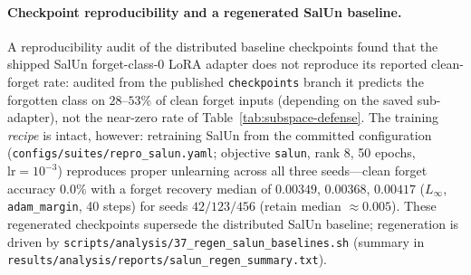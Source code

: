 \documentclass{article}
\begin{document}
\paragraph{Checkpoint reproducibility and a regenerated SalUn baseline.} A reproducibility audit of the distributed baseline checkpoints found that the shipped SalUn forget-class-0 LoRA adapter does not reproduce its reported clean-forget rate: audited from the published \texttt{checkpoints} branch it predicts the forgotten class on $28$--$53\%$ of clean forget inputs (depending on the saved sub-adapter), not the near-zero rate of Table~\ref{tab:subspace-defense}. The training \emph{recipe} is intact, however: retraining SalUn from the committed configuration (\texttt{configs/suites/repro\_salun.yaml}; objective \texttt{salun}, rank 8, 50 epochs, $\mathrm{lr}=10^{-3}$) reproduces proper unlearning across all three seeds---clean forget accuracy $0.0\%$ with a forget recovery median of $0.00349$, $0.00368$, $0.00417$ ($L_\infty$, \texttt{adam\_margin}, 40 steps) for seeds $42/123/456$ (retain median $\approx 0.005$). These regenerated checkpoints supersede the distributed SalUn baseline; regeneration is driven by \texttt{scripts/analysis/37\_regen\_salun\_baselines.sh} (summary in \texttt{results/analysis/reports/salun\_regen\_summary.txt}).
\end{document}
